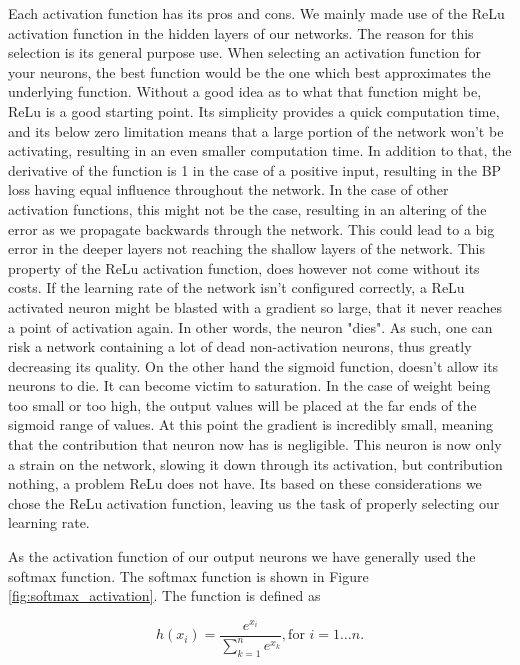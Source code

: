Each activation function has its pros and cons. We mainly made use of the
\gls{ReLu} activation function in the hidden layers of our networks. The
reason for this selection is its general purpose use. When selecting an
activation function for your neurons, the best function would be the one which
best approximates the underlying function. Without a good idea as to what
that function might be, \gls{ReLu} is a good starting point. Its simplicity
provides a quick computation time, and its below zero limitation means that a
large portion of the network won't be activating, resulting in an even smaller
computation time. In addition to that, the derivative of the function is 1
in the case of a positive input, resulting in the \gls{BP} loss having equal
influence throughout the network. In the case of other activation functions,
this might not be the case, resulting in an altering of the error as we
propagate backwards through the network. This could lead to a big error in the
deeper layers not reaching the shallow layers of the network. This property of
the \gls{ReLu} activation function, does however not come without its costs.
If the learning rate of the network isn't configured correctly, a \gls{ReLu}
activated neuron might be blasted with a gradient so large, that it never
reaches a point of activation again. In other words, the neuron "dies". As
such, one can risk a network containing a lot of dead non-activation neurons,
thus greatly decreasing its quality. On the other hand the sigmoid function,
doesn't allow its neurons to die. It can become victim to saturation. In
the case of weight being too small or too high, the output values will be
placed at the far ends of the sigmoid range of values. At this point the
gradient is incredibly small, meaning that the contribution that neuron now has
is negligible. This neuron is now only a strain on the network, slowing it
down through its activation, but contribution nothing, a problem \gls{ReLu}
does not have. Its based on these considerations we chose the \gls{ReLu}
activation function, leaving us the task of properly selecting our learning
rate.\cite{JiYan, AndrejKarpathy, AvinashSharmaV}

As the activation function of our output neurons we have generally
used the softmax function. The softmax function is shown in Figure
\ref{fig:softmax_activation}. The function is defined as

\begin{equation}
    h(x_i) = \frac{e^{x_i}}{\sum_{k=1}^n e^{x_k}}, \text{for $i = 1 \dots n$}.
\end{equation}

